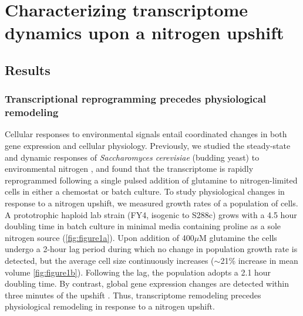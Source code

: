 \section{Characterizing transcriptome dynamics upon a nitrogen upshift}

\subsection{Results}

\subsubsection{Transcriptional reprogramming precedes physiological remodeling}

Cellular responses to environmental signals entail coordinated changes
in both gene expression and cellular physiology.  Previously, we
studied the steady-state and dynamic responses of 
\textit{Saccharomyces cerevisiae} 
(budding yeast) to environmental nitrogen
\parencite{airoldi2016steady}, and found that the transcriptome is rapidly
reprogrammed following a single pulsed addition of glutamine to
nitrogen-limited cells in either a chemostat or
batch culture. To study physiological changes in response to a
nitrogen upshift, we measured growth rates of a population of 
cells. A prototrophic haploid lab strain 
(FY4, isogenic to S288c) grows with a
4.5 hour doubling time in batch culture in minimal media 
containing proline as a sole
nitrogen source (\autoref{fig:figure1a}). Upon addition of 400$\mu$M glutamine
the cells undergo a 2-hour lag period during which no change in
population growth rate is detected, but the average cell size
continuously increases ($\sim$21\% increase in mean volume 
\autoref{fig:figure1b}). Following the lag, the population adopts a 2.1 
hour doubling time.
By contrast, global gene expression changes are detected
within three minutes of the upshift \parencite{airoldi2016steady}. 
Thus, transcriptome remodeling precedes
physiological remodeling in response to a nitrogen upshift.


